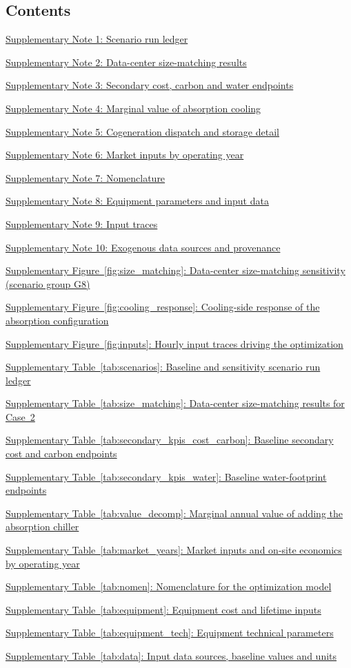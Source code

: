 \documentclass[sn-vancouver,Numbered]{sn-jnl}%
\newcommand{\sitocline}[2]{\noindent\hyperref[#2]{#1}~\nobreak\dotfill~\pageref{#2}\par\addvspace{2pt}}
\begin{document}
\subsection*{Contents}
{\small
\sitocline{Supplementary Note 1: Scenario run ledger}{note:scenarios}
\sitocline{Supplementary Note 2: Data-center size-matching results}{note:size}
\sitocline{Supplementary Note 3: Secondary cost, carbon and water endpoints}{note:secondary}
\sitocline{Supplementary Note 4: Marginal value of absorption cooling}{note:absvalue}
\sitocline{Supplementary Note 5: Cogeneration dispatch and storage detail}{note:dispatch}
\sitocline{Supplementary Note 6: Market inputs by operating year}{note:market}
\sitocline{Supplementary Note 7: Nomenclature}{note:nomen}
\sitocline{Supplementary Note 8: Equipment parameters and input data}{note:equipment}
\sitocline{Supplementary Note 9: Input traces}{note:inputs}
\sitocline{Supplementary Note 10: Exogenous data sources and provenance}{note:provenance}
\medskip
\sitocline{Supplementary Figure~\ref*{fig:size_matching}: Data-center size-matching sensitivity (scenario group G8)}{fig:size_matching}
\sitocline{Supplementary Figure~\ref*{fig:cooling_response}: Cooling-side response of the absorption configuration}{fig:cooling_response}
\sitocline{Supplementary Figure~\ref*{fig:inputs}: Hourly input traces driving the optimization}{fig:inputs}
\medskip
\sitocline{Supplementary Table~\ref*{tab:scenarios}: Baseline and sensitivity scenario run ledger}{tab:scenarios}
\sitocline{Supplementary Table~\ref*{tab:size_matching}: Data-center size-matching results for Case~2}{tab:size_matching}
\sitocline{Supplementary Table~\ref*{tab:secondary_kpis_cost_carbon}: Baseline secondary cost and carbon endpoints}{tab:secondary_kpis_cost_carbon}
\sitocline{Supplementary Table~\ref*{tab:secondary_kpis_water}: Baseline water-footprint endpoints}{tab:secondary_kpis_water}
\sitocline{Supplementary Table~\ref*{tab:value_decomp}: Marginal annual value of adding the absorption chiller}{tab:value_decomp}
\sitocline{Supplementary Table~\ref*{tab:market_years}: Market inputs and on-site economics by operating year}{tab:market_years}
\sitocline{Supplementary Table~\ref*{tab:nomen}: Nomenclature for the optimization model}{tab:nomen}
\sitocline{Supplementary Table~\ref*{tab:equipment}: Equipment cost and lifetime inputs}{tab:equipment}
\sitocline{Supplementary Table~\ref*{tab:equipment_tech}: Equipment technical parameters}{tab:equipment_tech}
\sitocline{Supplementary Table~\ref*{tab:data}: Input data sources, baseline values and units}{tab:data}
}
\clearpage
\end{document}
